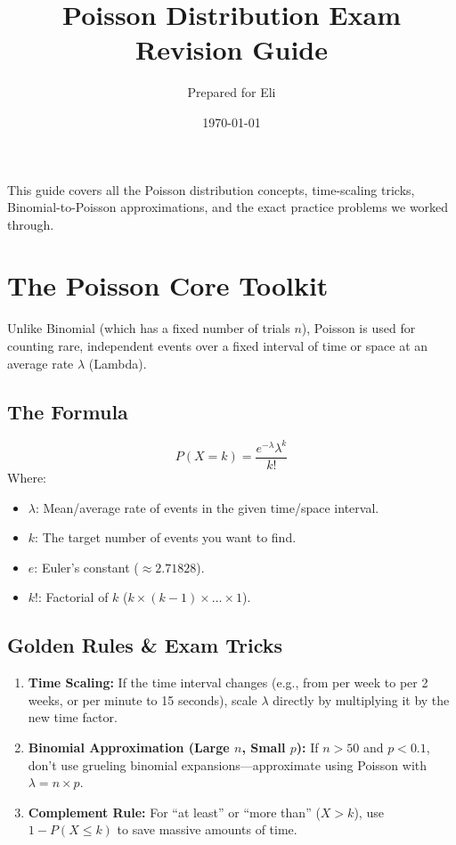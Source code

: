 \documentclass[11pt,a4paper]{article}
\title{\textbf{Poisson Distribution Exam Revision Guide}}
\author{Prepared for Eli}
\date{\today}
\begin{document}
\maketitle
\thispagestyle{empty}

\noindent This guide covers all the Poisson distribution concepts, time-scaling tricks, Binomial-to-Poisson approximations, and the exact practice problems we worked through.

\section*{The Poisson Core Toolkit}
Unlike Binomial (which has a fixed number of trials $n$), Poisson is used for counting rare, independent events over a fixed interval of time or space at an average rate $\lambda$ (Lambda).

\subsection*{The Formula}
$$P(X = k) = \frac{e^{-\lambda} \lambda^k}{k!}$$
Where:
\begin{itemize}
    \item \textbf{$\lambda$}: Mean/average rate of events in the given time/space interval.
    \item \textbf{$k$}: The target number of events you want to find.
    \item \textbf{$e$}: Euler's constant ($\approx 2.71828$).
    \item \textbf{$k!$}: Factorial of $k$ ($k \times (k-1) \times \dots \times 1$).
\end{itemize}

\subsection*{Golden Rules \& Exam Tricks}
\begin{enumerate}
    \item \textbf{Time Scaling:} If the time interval changes (e.g., from per week to per 2 weeks, or per minute to 15 seconds), scale $\lambda$ directly by multiplying it by the new time factor.
    \item \textbf{Binomial Approximation (Large $n$, Small $p$):} If $n > 50$ and $p < 0.1$, don't use grueling binomial expansions—approximate using Poisson with $\lambda = n \times p$.
    \item \textbf{Complement Rule:} For ``at least'' or ``more than'' ($X > k$), use $1 - P(X \le k)$ to save massive amounts of time.
\end{enumerate}
\end{document}
